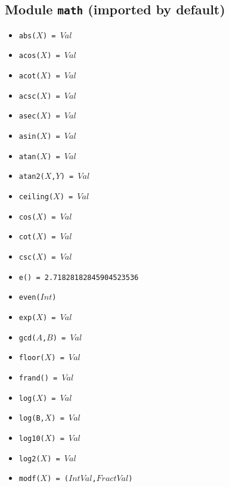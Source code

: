 \documentclass[10pt]{article}
\begin{document}
\begin{multicols}{2}
\section*{Module \texttt{math} (imported by default)}
\begin{scriptsize}
\begin{itemize}
   \item \texttt{abs($X$) = $Val$} 
   \item \texttt{acos($X$) = $Val$}
   \item \texttt{acot($X$) = $Val$}
   \item \texttt{acsc($X$) = $Val$} 
   \item \texttt{asec($X$) = $Val$}
   \item \texttt{asin($X$) = $Val$}
   \item \texttt{atan($X$) = $Val$}
   \item \texttt{atan2($X$,$Y$) = $Val$}
   \item \texttt{ceiling($X$) = $Val$} 
   \item \texttt{cos($X$) = $Val$} 
   \item \texttt{cot($X$) = $Val$}
   \item \texttt{csc($X$) = $Val$}
   \item \texttt{e() = 2.71828182845904523536} 
   \item \texttt{even($Int$)} 
   \item \texttt{exp($X$) = $Val$} 
   \item \texttt{gcd($A$,$B$) = $Val$} 
   \item \texttt{floor($X$) = $Val$} 
   \item \texttt{frand() = $Val$} 
   \item \texttt{log($X$) = $Val$}
   \item \texttt{log(B,$X$) = $Val$} 
   \item \texttt{log10($X$) = $Val$} 
   \item \texttt{log2($X$) = $Val$} 
   \item \texttt{modf($X$) = ($IntVal$,$FractVal$)} 

\end{itemize}
\end{scriptsize}
\end{multicols}
\end{document}
